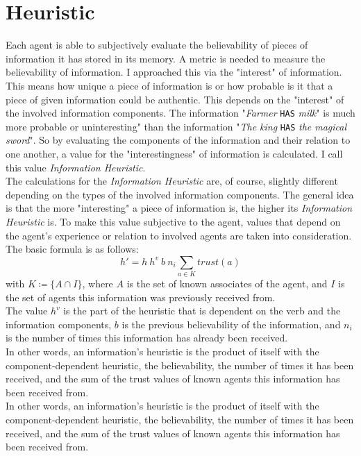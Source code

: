 \section{Heuristic}
\label{section:heuristic}
Each agent is able to subjectively evaluate the believability of pieces of information it has stored in its memory. A metric is needed to measure the believability of information. I approached this via the "interest" of information. This means how unique a piece of information is or how probable is it that a piece of given information could be authentic. This depends on the "interest" of the involved information components. The information "\textit{Farmer} \verb|HAS| \textit{milk}" is much more probable or uninteresting" than the information "\textit{The king} \verb|HAS| \textit{the magical sword}". So by evaluating the components of the information and their relation to one another, a value for the "interestingness" of information is calculated. I call this value \textit{Information Heuristic}.\\
The calculations for the \textit{Information Heuristic} are, of course, slightly different depending on the types of the involved information components. The general idea is that the more "interesting" a piece of information is, the higher its \textit{Information Heuristic} is. To make this value subjective to the agent, values that depend on the agent's experience or relation to involved agents are taken into consideration.\\
The basic formula is as follows:
\begin{equation*}
	h' = h\ h^{v}\ b\ n_i\sum_{a \in K}trust(a)
\end{equation*}
with $K \coloneqq \{A \cap I\}$, where $A$ is the set of known associates of the agent, and $I$ is the set of agents this information was previously received from.\\
The value $h^{v}$ is the part of the heuristic that is dependent on the verb and the information components, $b$ is the previous believability of the information, and $n_i$ is the number of times this information has already been received.\\
In other words, an information's heuristic is the product of itself with the component-dependent heuristic, the believability, the number of times it has been received, and the sum of the trust values of known agents this information has been received from. \\
In other words, an information’s heuristic is the product of itself with the component-dependent heuristic, the believability, the number of times it has been received, and the sum of the trust values of known agents this information has been received from.\\
